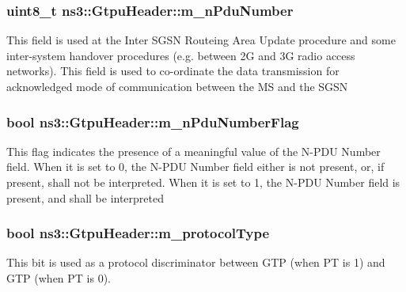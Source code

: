 \subsubsection[{\texorpdfstring{m\+\_\+n\+Pdu\+Number}{m_nPduNumber}}]{\setlength{\rightskip}{0pt plus 5cm}uint8\+\_\+t ns3\+::\+Gtpu\+Header\+::m\+\_\+n\+Pdu\+Number\hspace{0.3cm}{\ttfamily [private]}}\hypertarget{classns3_1_1GtpuHeader_a807ca692a4cfc9124abf02544f3d096a}{}\label{classns3_1_1GtpuHeader_a807ca692a4cfc9124abf02544f3d096a}
This field is used at the Inter S\+G\+SN Routeing Area Update procedure and some inter-\/system handover procedures (e.\+g. between 2G and 3G radio access networks). This field is used to co-\/ordinate the data transmission for acknowledged mode of communication between the MS and the S\+G\+SN 
\subsubsection[{\texorpdfstring{m\+\_\+n\+Pdu\+Number\+Flag}{m_nPduNumberFlag}}]{\setlength{\rightskip}{0pt plus 5cm}bool ns3\+::\+Gtpu\+Header\+::m\+\_\+n\+Pdu\+Number\+Flag\hspace{0.3cm}{\ttfamily [private]}}\hypertarget{classns3_1_1GtpuHeader_a2b5367fdc1e0be87bcd9b9911853a64e}{}\label{classns3_1_1GtpuHeader_a2b5367fdc1e0be87bcd9b9911853a64e}
This flag indicates the presence of a meaningful value of the N-\/\+P\+DU Number field. When it is set to \textquotesingle{}0\textquotesingle{}, the N-\/\+P\+DU Number field either is not present, or, if present, shall not be interpreted. When it is set to \textquotesingle{}1\textquotesingle{}, the N-\/\+P\+DU Number field is present, and shall be interpreted 
\subsubsection[{\texorpdfstring{m\+\_\+protocol\+Type}{m_protocolType}}]{\setlength{\rightskip}{0pt plus 5cm}bool ns3\+::\+Gtpu\+Header\+::m\+\_\+protocol\+Type\hspace{0.3cm}{\ttfamily [private]}}\hypertarget{classns3_1_1GtpuHeader_a48a7c185f083bc8da2ee925b4766c69f}{}\label{classns3_1_1GtpuHeader_a48a7c185f083bc8da2ee925b4766c69f}
This bit is used as a protocol discriminator between G\+TP (when PT is \textquotesingle{}1\textquotesingle{}) and G\+TP\textquotesingle{} (when PT is \textquotesingle{}0\textquotesingle{}). 
